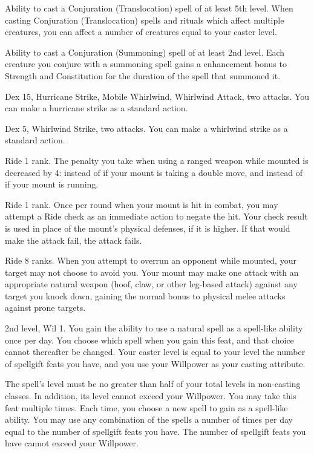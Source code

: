\featpre Ability to cast a Conjuration (Translocation) spell of at least 5th level.
\featben When casting Conjuration (Translocation) spells and rituals which affect multiple creatures, you can affect a number of creatures equal to your caster level.

\featpre Ability to cast a Conjuration (Summoning) spell of at least 2nd level.
\featben Each creature you conjure with a summoning spell gains a  enhancement bonus to Strength and Constitution for the duration of the spell that summoned it.

\featpres Dex 15, Hurricane Strike, Mobile Whirlwind, Whirlwind Attack, two attacks.
\featben You can make a hurricane strike as a standard action.

\featpres Dex 5, Whirlwind Strike, two attacks.
\featben You can make a whirlwind strike as a standard action.

\featpre Ride 1 rank.
\featben The penalty you take when using a ranged weapon while mounted is decreased by 4:  instead of  if your mount is taking a double move, and  instead of  if your mount is running.

\featpre Ride 1 rank.
\featben Once per round when your mount is hit in combat, you may attempt a Ride check as an immediate action to negate the hit.
Your check result is used in place of the mount's physical defenses, if it is higher.
If that would make the attack fail, the attack fails.

\featpres
Ride 8 ranks.
\featben When you attempt to overrun an opponent while mounted, your target may not choose to avoid you.
Your mount may make one attack with an appropriate natural weapon (hoof, claw, or other leg-based attack) against any target you knock down, gaining the normal  bonus to physical melee attacks against prone targets.

\featpre 2nd level, Wil 1.
\featben You gain the ability to use a natural spell as a spell-like ability once per day.
You choose which spell when you gain this feat, and that choice cannot thereafter be changed.
Your caster level is equal to your level \add the number of spellgift feats you have, and you use your Willpower as your casting attribute.

The spell's level must be no greater than half of your total levels in non-casting classes.
In addition, its level cannot exceed your Willpower.
You may take this feat multiple times.
Each time, you choose a new spell to gain as a spell-like ability.
You may use any combination of the spells a number of times per day equal to the number of spellgift feats you have.
The number of spellgift feats you have cannot exceed your Willpower.

